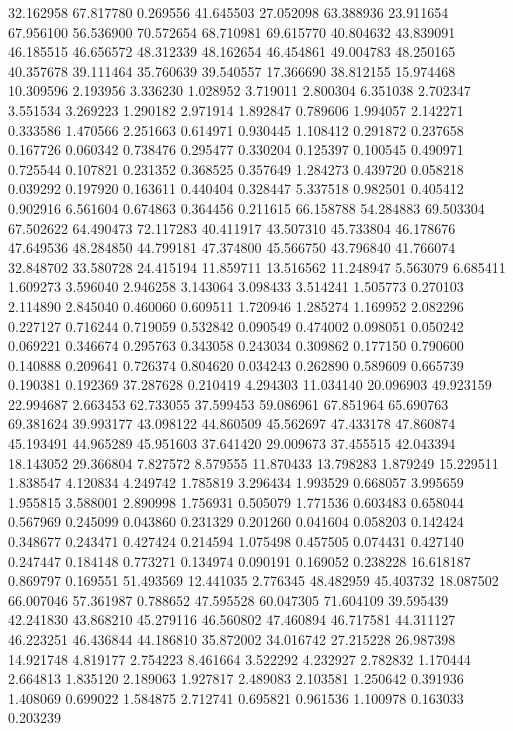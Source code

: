 32.162958
67.817780
0.269556
41.645503
27.052098
63.388936
23.911654
67.956100
56.536900
70.572654
68.710981
69.615770
40.804632
43.839091
46.185515
46.656572
48.312339
48.162654
46.454861
49.004783
48.250165
40.357678
39.111464
35.760639
39.540557
17.366690
38.812155
15.974468
10.309596
2.193956
3.336230
1.028952
3.719011
2.800304
6.351038
2.702347
3.551534
3.269223
1.290182
2.971914
1.892847
0.789606
1.994057
2.142271
0.333586
1.470566
2.251663
0.614971
0.930445
1.108412
0.291872
0.237658
0.167726
0.060342
0.738476
0.295477
0.330204
0.125397
0.100545
0.490971
0.725544
0.107821
0.231352
0.368525
0.357649
1.284273
0.439720
0.058218
0.039292
0.197920
0.163611
0.440404
0.328447
5.337518
0.982501
0.405412
0.902916
6.561604
0.674863
0.364456
0.211615
66.158788
54.284883
69.503304
67.502622
64.490473
72.117283
40.411917
43.507310
45.733804
46.178676
47.649536
48.284850
44.799181
47.374800
45.566750
43.796840
41.766074
32.848702
33.580728
24.415194
11.859711
13.516562
11.248947
5.563079
6.685411
1.609273
3.596040
2.946258
3.143064
3.098433
3.514241
1.505773
0.270103
2.114890
2.845040
0.460060
0.609511
1.720946
1.285274
1.169952
2.082296
0.227127
0.716244
0.719059
0.532842
0.090549
0.474002
0.098051
0.050242
0.069221
0.346674
0.295763
0.343058
0.243034
0.309862
0.177150
0.790600
0.140888
0.209641
0.726374
0.804620
0.034243
0.262890
0.589609
0.665739
0.190381
0.192369
37.287628
0.210419
4.294303
11.034140
20.096903
49.923159
22.994687
2.663453
62.733055
37.599453
59.086961
67.851964
65.690763
69.381624
39.993177
43.098122
44.860509
45.562697
47.433178
47.860874
45.193491
44.965289
45.951603
37.641420
29.009673
37.455515
42.043394
18.143052
29.366804
7.827572
8.579555
11.870433
13.798283
1.879249
15.229511
1.838547
4.120834
4.249742
1.785819
3.296434
1.993529
0.668057
3.995659
1.955815
3.588001
2.890998
1.756931
0.505079
1.771536
0.603483
0.658044
0.567969
0.245099
0.043860
0.231329
0.201260
0.041604
0.058203
0.142424
0.348677
0.243471
0.427424
0.214594
1.075498
0.457505
0.074431
0.427140
0.247447
0.184148
0.773271
0.134974
0.090191
0.169052
0.238228
16.618187
0.869797
0.169551
51.493569
12.441035
2.776345
48.482959
45.403732
18.087502
66.007046
57.361987
0.788652
47.595528
60.047305
71.604109
39.595439
42.241830
43.868210
45.279116
46.560802
47.460894
46.717581
44.311127
46.223251
46.436844
44.186810
35.872002
34.016742
27.215228
26.987398
14.921748
4.819177
2.754223
8.461664
3.522292
4.232927
2.782832
1.170444
2.664813
1.835120
2.189063
1.927817
2.489083
2.103581
1.250642
0.391936
1.408069
0.699022
1.584875
2.712741
0.695821
0.961536
1.100978
0.163033
0.203239
